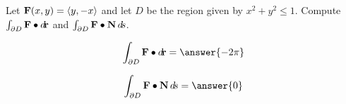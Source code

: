 \documentclass{ximera}
\author{David Guichard \and Neal Koblitz \and H. Jerome Keisler \and Albert Scheller \and Barry Balof \and Mike Wills \and Matthew Carr}
\begin{document}
\begin{exercise}




Let $\mathbf{F}(x,y)=\left\langle y,-x\right\rangle$ and let $D$ be the region given by $x^2+y^2\le 1$. Compute $\int_{\partial D}\mathbf{F}\bullet\mathop{}\!d\!\mathbf{r}$ and $\int_{\partial D}\mathbf{F}\bullet\mathbf{N}\mathop{}\!d\! s$.
 
\begin{prompt}
\[
\int_{\partial D}\vec{F}\dotp\d\vec{r}=\answer{-2\pi}
\]
\end{prompt}

\begin{prompt}
\[
\int_{\partial D}\vec{F}\dotp\vec{N}\d s=\answer{0}
\]
\end{prompt}



\end{exercise}
\end{document}
